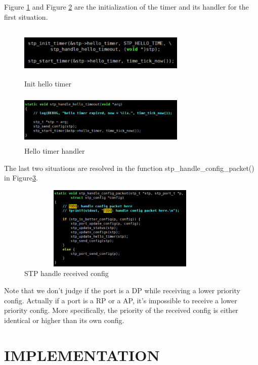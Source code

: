 \documentclass{article}
\begin{document}
Figure \ref{hello_timer} and Figure \ref{hello_timer_handler} are the initialization of the timer and its handler for the first situation.

\begin{figure}[ht]
	\centering
	\includegraphics[width=8cm, height=2.5cm]{hello_timer.png}
	\caption{Init hello timer}
	\label{hello_timer}
\end{figure}

\begin{figure}[ht]
	\centering
	\includegraphics[width=8cm, height=2.5cm]{hello_timer_handler.png}
	\caption{Hello timer handler}
	\label{hello_timer_handler}
\end{figure}

The last two situations are resolved in the function stp\_handle\_config\_packet() in Figure\ref{stp_handle_config_packet}.

\begin{figure}[ht]
	\centering
	\includegraphics[width=10cm, height=4cm]{stp_handle_config_packet.png}
	\caption{STP handle received config}
	\label{stp_handle_config_packet}
\end{figure}

Note that we don't judge if the port is a DP while receiving a lower priority config.
Actually if a port is a RP or a AP, it's impossible to receive a lower priority config.
More specifically, the priority of the received config is either identical or higher
than its own config.

\section{IMPLEMENTATION}
\end{document}
